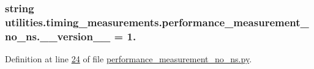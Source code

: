 \subsubsection[{\+\_\+\+\_\+version\+\_\+\+\_\+}]{\setlength{\rightskip}{0pt plus 5cm}string utilities.\+timing\+\_\+measurements.\+performance\+\_\+measurement\+\_\+no\+\_\+ns.\+\_\+\+\_\+version\+\_\+\+\_\+ = \textquotesingle{}1.\textquotesingle{}}\label{namespaceutilities_1_1timing__measurements_1_1performance__measurement__no__ns_aad2678d45f225046185eb85ebe3cdc6a}


Definition at line \hyperlink{performance__measurement__no__ns_8py_source_l00024}{24} of file \hyperlink{performance__measurement__no__ns_8py_source}{performance\+\_\+measurement\+\_\+no\+\_\+ns.\+py}.

